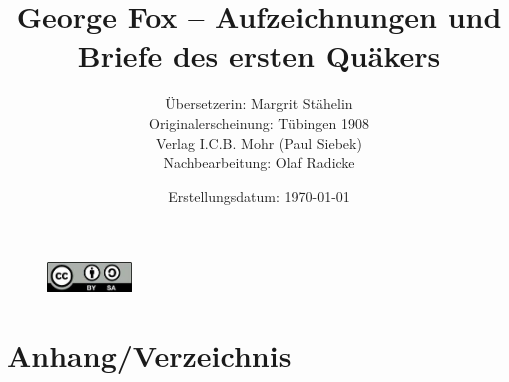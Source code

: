 \documentclass[a4paper,12pt,twoside]{book} %
\title{George Fox -- Aufzeichnungen und Briefe des ersten Quäkers}
\author{Übersetzerin: Margrit Stähelin \\ 
Originalerscheinung: Tübingen 1908 \\ 
Verlag I.C.B. Mohr (Paul Siebek) \\
Nachbearbeitung: Olaf Radicke
}
\date{Erstellungsdatum: \today}
\begin{document}
\maketitle


\begin{figure}[h!]
 \centering
 \includegraphics[height=30px]{./pics/cc-lizenz-by.png}
\end{figure}

\newpage 

\tableofcontents

\newpage

\frontmatter 



\newpage 

\mainmatter 

% 




























% 
 
\backmatter

\chapter{Anhang/Verzeichnis}



\cleardoublepage


\cleardoublepage

\printindex

  \printindex[bibel]
\cleardoublepage

  \printindex[brief]
\cleardoublepage

  \printindex[buch]
\cleardoublepage

  \printindex[ort]
\cleardoublepage

  \printindex[person]
\cleardoublepage
\end{document}
